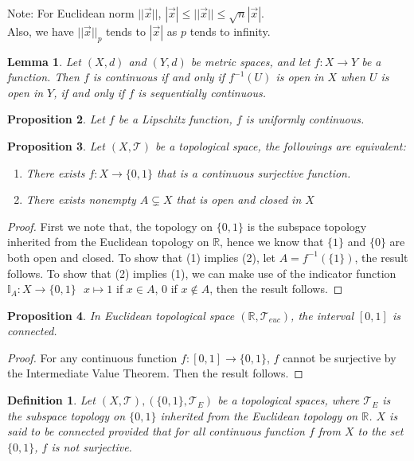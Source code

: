 \documentclass[15pt]{book}
\theoremstyle{break}
\theoremstyle{break}
\newtheorem{lem}{Lemma}[thm]
\newtheorem{prop}[lem]{Proposition}
\newtheorem{defn}{Definition}[corL]
\newcommand{\R}{\mathbb{R}}
\newcommand{\T}{\mathcal{T}}
\newcommand{\note}{\color{red}Note: \color{black}}
\begin{document}
\note For Euclidean norm $||\vec{x}||$, $|\vec{x}|\leq ||\vec{x}|| \leq  \sqrt{n}|\vec{x}|$.\\ 
Also, we have $||\vec{x}||_p$ tends to $|\vec{x}|$ as $p$ tends to infinity.



\begin{lem}
Let $(X,d)$ and $(Y,d)$ be metric spaces, and let $f:X\to Y$ be a function. Then $f$ is continuous if and only if $f^{-1}(U)$ is open in $X$ when $U$ is open in $Y$, if and only if $f$ is sequentially continuous.
\end{lem}

\begin{prop}
Let $f$ be a Lipschitz function, $f$ is uniformly continuous.
\end{prop}

\begin{prop}
Let $(X,\T)$ be a topological space, the followings are equivalent:
\begin{enumerate}[topsep=3pt,itemsep=-1ex,partopsep=1ex,parsep=1ex]
\item There exists $f:X \to \{0,1\}$ that is a continuous surjective function.
\item There exists nonempty $A \subsetneq X$ that is open and closed in $X$
\end{enumerate}
\end{prop}
\begin{proof}
First we note that, the topology on $\{0,1\}$ is the subspace topology inherited from the Euclidean topology on $\R$, hence we know that $\{1\}$ and $\{0\}$ are both open and closed. To show that (1) implies (2), let $A = f^{-1}(\{1\})$, the result follows. To show that (2) implies (1), we can make use of the indicator function $\mathbb{I}_A: X \to \{0,1\} \ \ \ x\mapsto 1$ if $x \in A$, $0$ if $x \notin A$, then the result follows.
\end{proof}


\begin{prop}
In Euclidean topological space $(\R,\T_{euc})$, the interval $[0,1]$ is connected. 
\end{prop}
\begin{proof}
For any continuous function $f:[0,1]\to \{0,1\}$, $f$ cannot be surjective by the Intermediate Value Theorem. Then the result follows.
\end{proof}

\begin{defn}
Let $(X,\T), (\{0,1\}, \T_E)$ be a topological spaces, where $\T_E$ is the subspace topology on $\{0,1\}$ inherited from the Euclidean topology on $\R$. $X$ is said to be connected provided that for all continuous function $f$ from $X$ to the set $\{0,1\}$, $f$ is not surjective. 
\end{defn}
\end{document}
